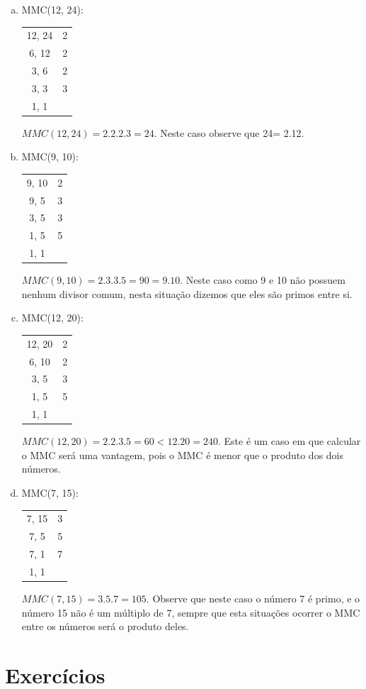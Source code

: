   \begin{exem}
  \begin{enumerate}[a)]
  \item MMC(12, 24):

 \begin{tabular}{c|c}
  12, 24 & 2 \\
   6, 12 & 2 \\
   3,  6 & 2 \\
   3,  3 & 3 \\
   1,  1 &
 \end{tabular}
 $MMC(12, 24) = 2.2.2.3= 24$. Neste caso observe que 24= 2.12.

   \item MMC(9, 10):

   \begin{tabular}{c|c}
    9, 10 & 2 \\
    9, 5  & 3 \\
    3, 5  & 3 \\
    1, 5  & 5 \\
    1, 1  & \\
   \end{tabular}
   $MMC(9, 10)= 2.3.3.5= 90= 9.10$. Neste caso como 9 e 10 não possuem nenhum divisor comum, nesta situação dizemos que eles são primos entre si.

   \item MMC(12, 20):

   \begin{tabular}{c|c}
    12, 20 & 2 \\
     6, 10 & 2 \\
     3,  5 & 3 \\
     1,  5 & 5 \\
     1,  1 & \\
   \end{tabular}
  $MMC(12, 20)= 2.2.3.5= 60 < 12.20= 240$. Este é um caso em que calcular o MMC será uma vantagem, pois o MMC é menor que o produto dos dois números.

  \item MMC(7, 15):

  \begin{tabular}{c|c}
   7, 15 & 3 \\
   7,  5 & 5 \\
   7,  1 & 7 \\
   1,  1 &  \\
  \end{tabular}
  $MMC(7, 15)= 3.5.7= 105$. Observe que neste caso o número 7 é primo, e o número 15 não é um múltiplo de 7, sempre que esta situações ocorrer o MMC entre os números será o produto deles.
  \end{enumerate}

 \end{exem}

\section{Exercícios}

\construirExer